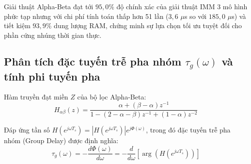 \begin{table}[H]
\centering
\caption{So sánh sai số RMSE, chi phí tính toán và mức chiếm dụng bộ nhớ giữa các kiến trúc lọc}
\label{tab:imm-vs-alphabeta-comparison}
\end{table}

Giải thuật Alpha-Beta đạt tới $95{,}0\%$ độ chính xác của giải thuật IMM 3 mô hình phức tạp nhưng với chi phí tính toán thấp hơn 51 lần ($3{,}6$ $\mu$s so với $185{,}0$ $\mu$s) và tiết kiệm $93{,}9\%$ dung lượng RAM, chứng minh sự lựa chọn tối ưu tuyệt đối cho phần cứng nhúng thời gian thực.

\subsection{Phân tích đặc tuyến trễ pha nhóm \texorpdfstring{$\tau_g(\omega)$}{tau\_g(omega)} và tính phi tuyến pha}

\hspace{0.5cm} Hàm truyền đạt miền $Z$ của bộ lọc Alpha-Beta:
\begin{equation}
H_{\alpha\beta}(z) = \frac{\alpha + (\beta - \alpha)z^{-1}}{1 - (2 - \alpha - \beta)z^{-1} + (1 - \alpha)z^{-2}}
\label{eq:alphabeta-z-transfer-function}
\end{equation}

Đáp ứng tần số $H(e^{j\omega T_s}) = |H(e^{j\omega T_s})| e^{j \Phi(\omega)}$, trong đó đặc tuyến trễ pha nhóm (Group Delay) được định nghĩa:
\begin{equation}
\tau_g(\omega) = -\frac{d\Phi(\omega)}{d\omega} = -\frac{d}{d\omega} \left[ \arg\left( H(e^{j\omega T_s}) \right) \right]
\label{eq:group-delay-derivative-formula}
\end{equation}

